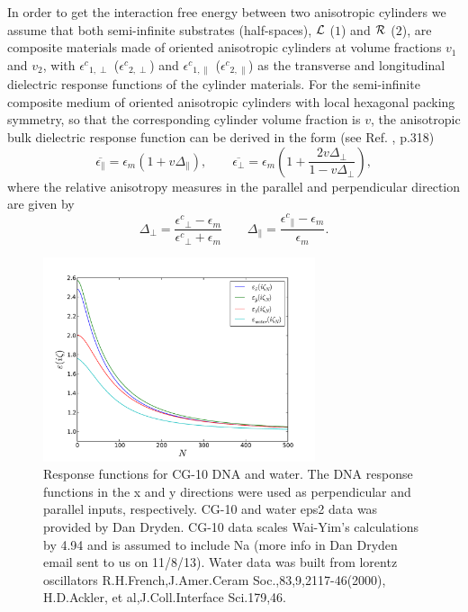 \documentclass[onecolumn,letterpaper,amsmath,amssymb,floatfix,aps,superscriptaddress]{revtex4}
\begin{document}
In order to get the interaction free energy between two anisotropic cylinders we assume that both semi-infinite substrates (half-spaces), ${\cal L}$ ($1$) and ${\cal R}$ ($2$), are 
composite materials made of oriented anisotropic cylinders at volume fractions $v_1$ and $v_2$, with ${\epsilon^{c}}_{1,\perp}$ (${\epsilon^{c}}_{2,\perp}$) 
and ${\epsilon^{c}}_{1,\parallel}$ (${\epsilon^{c}}_{2,\parallel}$) as the transverse and longitudinal
dielectric response functions of the cylinder materials. For the semi-infinite composite medium of oriented anisotropic cylinders with local hexagonal  packing symmetry, so that the corresponding cylinder volume fraction is $v$, the anisotropic bulk dielectric response function can be derived in the
form (see Ref. , p.318) 
\begin{equation}
\overline{\epsilon_{\parallel}}=\epsilon_{m}\left(1+v\Delta_{\parallel}\right),\qquad\overline{\epsilon_{\perp}}=\epsilon_{m}\left(1+\frac{2v\Delta_{\perp}}{1-v\Delta_{\perp}}\right),\label{eq:v_dependance}
\end{equation}
where the relative anisotropy measures in the parallel and perpendicular direction are given by
\begin{equation}
\Delta_{\perp}=\frac{{\epsilon^{c}}_{\perp}-\epsilon_{m}}{{\epsilon^{c}}_{\perp}+\epsilon_{m}}\qquad\Delta_{\parallel}=\frac{{\epsilon^{c}}_{\parallel}-\epsilon_{m}}{\epsilon_{m}}.
\label{anisoind}
\end{equation}

\begin{figure}
\centerline{\includegraphics[width=8cm]{./140220_cyl-cyl/eiz.pdf}}
\caption{\label{fig:1} Response functions for CG-10 DNA and water. The DNA response functions in the x and y directions were used as perpendicular and parallel inputs, respectively.  CG-10 and water eps2 data was provided by Dan Dryden. CG-10 data scales Wai-Yim's calculations by 4.94 and is assumed to include Na (more info in Dan Dryden email sent to us on 11/8/13).  Water data was built from lorentz oscillators R.H.French,J.Amer.Ceram Soc.,83,9,2117-46(2000), H.D.Ackler, et al,J.Coll.Interface Sci.179,46. }
\end{figure}
\end{document}
